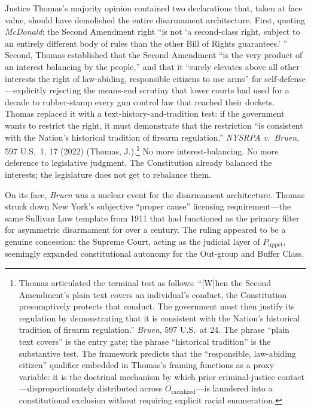 Justice Thomas's majority opinion contained two declarations that, taken at face value, should have demolished the entire disarmament architecture. First, quoting \textit{McDonald}: the Second Amendment right ``is not `a second-class right, subject to an entirely different body of rules than the other Bill of Rights guarantees.' '' Second, Thomas established that the Second Amendment ``is the very product of an interest balancing by the people,'' and that it ``surely elevates above all other interests the right of law-abiding, responsible citizens to use arms'' for self-defense---explicitly rejecting the means-end scrutiny that lower courts had used for a decade to rubber-stamp every gun control law that reached their dockets. Thomas replaced it with a text-history-and-tradition test: if the government wants to restrict the right, it must demonstrate that the restriction ``is consistent with the Nation's historical tradition of firearm regulation.'' \textit{NYSRPA v.\ Bruen}, 597 U.S.\ 1, 17 (2022) (Thomas, J.).\footnote{Thomas articulated the terminal test as follows: ``[W]hen the Second Amendment's plain text covers an individual's conduct, the Constitution presumptively protects that conduct. The government must then justify its regulation by demonstrating that it is consistent with the Nation's historical tradition of firearm regulation.'' \textit{Bruen}, 597 U.S.\ at 24. The phrase ``plain text covers'' is the entry gate; the phrase ``historical tradition'' is the substantive test. The framework predicts that the ``responsible, law-abiding citizen'' qualifier embedded in Thomas's framing functions as a proxy variable: it is the doctrinal mechanism by which prior criminal-justice contact---disproportionately distributed across $O_{\text{racialized}}$---is laundered into a constitutional exclusion without requiring explicit racial enumeration.} No more interest-balancing. No more deference to legislative judgment. The Constitution already balanced the interests; the legislature does not get to rebalance them.

On its face, \textit{Bruen} was a nuclear event for the disarmament architecture. Thomas struck down New York's subjective ``proper cause'' licensing requirement---the same Sullivan Law template from 1911 that had functioned as the primary filter for asymmetric disarmament for over a century. The ruling appeared to be a genuine concession: the Supreme Court, acting as the judicial layer of $P_{\text{uppet}}$, seemingly expanded constitutional autonomy for the Out-group and Buffer Class.

